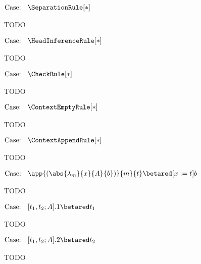 $\text{Case: }\begin{array}{c} \SeparationRule[*] \end{array}$
\begin{proofcase}
    TODO
\end{proofcase}

$\text{Case: }\begin{array}{c} \HeadInferenceRule[*] \end{array}$
\begin{proofcase}
    TODO
\end{proofcase}

$\text{Case: }\begin{array}{c} \CheckRule[*] \end{array}$
\begin{proofcase}
    TODO
\end{proofcase}

$\text{Case: }\begin{array}{c} \ContextEmptyRule[*] \end{array}$
\begin{proofcase}
    TODO
\end{proofcase}

$\text{Case: }\begin{array}{c} \ContextAppendRule[*] \end{array}$
\begin{proofcase}
    TODO
\end{proofcase}



$\text{Case: }\begin{array}{c} \app{(\abs{\lambda_m}{x}{A}{b})}{m}{t} \betared [x := t]b \end{array}$
\begin{proofcase}
    TODO
\end{proofcase}

$\text{Case: }\begin{array}{c} [t_1, t_2; A].1 \betared t_1 \end{array}$
\begin{proofcase}
    TODO
\end{proofcase}

$\text{Case: }\begin{array}{c} [t_1, t_2; A].2 \betared t_2 \end{array}$
\begin{proofcase}
    TODO
\end{proofcase}

